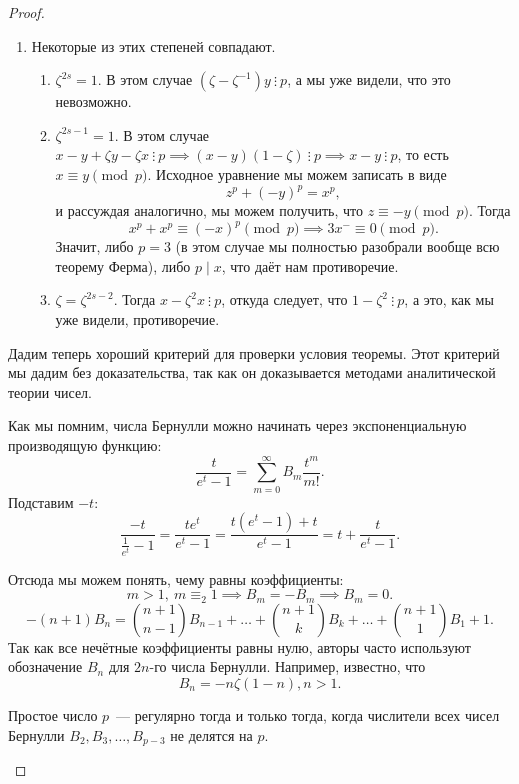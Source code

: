 \begin{proof}
\begin{enumerate}
 		 	\item Некоторые из этих степеней совпадают. 
 		 		\begin{enumerate}
 		 			\item $\zeta^{2s} = 1$. В этом случае $(\zeta - \zeta^{-1})y \ \vdots \ p$,  а мы уже видели, что это невозможно. 

 		 			\item $\zeta^{2s - 1} = 1$.  В этом случае $x - y + \zeta y - \zeta x \ \vdots \ p \implies (x - y)(1 - \zeta) \ \vdots \ p \implies x - y \ \vdots \ p$, то есть $x \equiv y \pmod{p}$. Исходное уравнение мы можем записать в виде 
 		 			\[
 		 				z^p + (-y)^p = x^p,
 		 			\]
 		 			и рассуждая аналогично, мы можем получить, что $z \equiv - y \pmod{p}$. Тогда 
 		 			\[
 		 				x^p + x^p \equiv (-x)^{p} \pmod{p} \implies 3x^{-} \equiv 0 \pmod{p}.
 		 			\]
 		 			Значит, либо $p = 3$ (в этом случае мы полностью разобрали вообще всю теорему Ферма), либо $p \mid x$, что даёт нам противоречие. 
 		 			

 		 			\item $\zeta = \zeta^{2s - 2}$. Тогда $x - \zeta^2 x \ \vdots \ p$, откуда следует, что $1 - \zeta^2 \ \vdots \ p$, а это, как мы уже видели, противоречие. 
 		 		\end{enumerate}
 		 \end{enumerate}

 		 Дадим теперь хороший критерий для проверки условия теоремы. Этот критерий мы дадим без доказательства, так как он доказывается методами аналитической теории чисел. 

 		 Как мы помним, числа Бернулли можно начинать через экспоненциальную производящую функцию: 
 		 \[
 		 	\frac{t}{e^t - 1} = \sum_{m = 0}^{\infty} B_{m} \frac{t^m}{m!}.
 		 \]
 		 Подставим $-t$:
 		 \[
 		 	\frac{-t}{\frac{1}{e^{t}} - 1} = \frac{t e^{t}}{e^{t} - 1} = \frac{t(e^t - 1) + t}{e^t - 1} = t + \frac{t}{e^t - 1}.
 		 \]

 		 Отсюда мы можем понять, чему равны коэффициенты: 
 		 \[
 		 	m > 1, \ m \equiv_{2} 1 \implies B_m = -B_m \implies B_m = 0.
 		 \]
 		 \[
 		 	-(n + 1)B_n = \binom{n + 1}{n - 1} B_{n - 1} + \ldots + \binom{n + 1}{k}B_{k} + \ldots + \binom{n + 1}{1} B_{1} + 1. 
 		 \]
 		 Так как все нечётные коэффициенты равны нулю, авторы часто используют обозначение $B_n$ для $2n$-го числа Бернулли. Например, известно, что 
 		 \[
 		 	B_{n} = -n \zeta(1 - n), n > 1.
 		 \]

 		 \begin{theorem} 
 		 	Простое число $p$~--- регулярно тогда и только тогда, когда числители всех чисел Бернулли $B_{2}, B_{3}, \ldots, B_{p - 3}$ не делятся на $p$.
 		 \end{theorem}


\end{proof}
